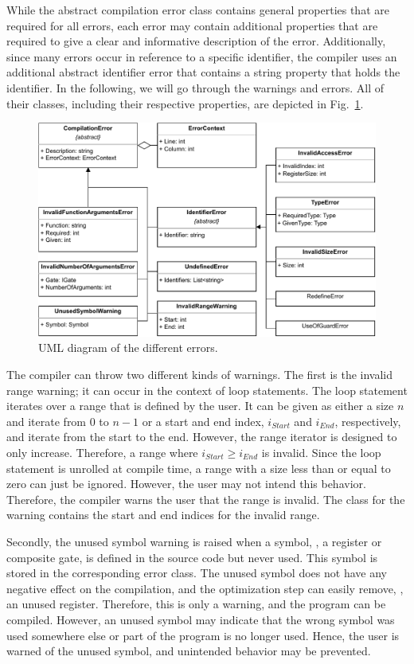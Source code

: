 While the abstract compilation error class contains general properties that are required for all errors, each error may contain additional properties that are required to give a clear and informative description of the error. Additionally, since many errors occur in reference to a specific identifier, the compiler uses an additional abstract identifier error that contains a string property that holds the identifier. In the following, we will go through the warnings and errors. All of their classes, including their respective properties, are depicted in Fig.~\ref{fig:implementation_uml_errors}.

\begin{figure}[htp]
    \centering
    \includegraphics[width=.9\textwidth]{../figures/drawio/uml_errors.pdf}
    \caption{UML diagram of the different errors.}
    \label{fig:implementation_uml_errors}
\end{figure}

The compiler can throw two different kinds of warnings. The first is the invalid range warning; it can occur in the context of loop statements. The loop statement iterates over a range that is defined by the user. It can be given as either a size $n$ and iterate from $0$ to $n-1$ or a start and end index, $i_{Start}$ and $i_{End}$, respectively, and iterate from the start to the end. However, the range iterator is designed to only increase. Therefore, a range where $i_{Start} \geq i_{End}$ is invalid. Since the loop statement is unrolled at compile time, a range with a size less than or equal to zero can just be ignored. However, the user may not intend this behavior. Therefore, the compiler warns the user that the range is invalid. The class for the warning contains the start and end indices for the invalid range.

Secondly, the unused symbol warning is raised when a symbol, \eg, a register or composite gate, is defined in the source code but never used. This symbol is stored in the corresponding error class. The unused symbol does not have any negative effect on the compilation, and the optimization step can easily remove, \eg, an unused register. Therefore, this is only a warning, and the program can be compiled. However, an unused symbol may indicate that the wrong symbol was used somewhere else or part of the program is no longer used. Hence, the user is warned of the unused symbol, and unintended behavior may be prevented.

